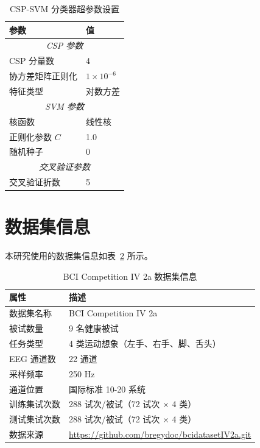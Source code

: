 \begin{table}[H]
\centering
\caption{CSP-SVM 分类器超参数设置}
\label{tab:csp_svm_params}
\begin{tabular}{ll}
\hline
\textbf{参数} & \textbf{值} \\
\hline
\multicolumn{2}{c}{\textit{CSP 参数}} \\
\hline
CSP 分量数 & 4 \\
协方差矩阵正则化 & $1 \times 10^{-6}$ \\
特征类型 & 对数方差 \\
\hline
\multicolumn{2}{c}{\textit{SVM 参数}} \\
\hline
核函数 & 线性核 \\
正则化参数 $C$ & 1.0 \\
随机种子 & 0 \\
\hline
\multicolumn{2}{c}{\textit{交叉验证参数}} \\
\hline
交叉验证折数 & 5 \\
\hline
\end{tabular}
\end{table}



\section{数据集信息}
\label{sec:dataset_info}

本研究使用的数据集信息如表~\ref{tab:dataset_info} 所示。

\begin{table}[H]
\centering
\caption{BCI Competition IV 2a 数据集信息}
\label{tab:dataset_info}
\begin{tabular}{ll}
\hline
\textbf{属性} & \textbf{描述} \\
\hline
数据集名称 & BCI Competition IV 2a \\
被试数量 & 9 名健康被试 \\
任务类型 & 4 类运动想象（左手、右手、脚、舌头） \\
EEG 通道数 & 22 通道 \\
采样频率 & 250 Hz \\
通道位置 & 国际标准 10-20 系统 \\
训练集试次数 & 288 试次/被试（72 试次 × 4 类） \\
测试集试次数 & 288 试次/被试（72 试次 × 4 类） \\
数据来源 & \url{https://github.com/bregydoc/bcidatasetIV2a.git} \\
\hline
\end{tabular}
\end{table}



